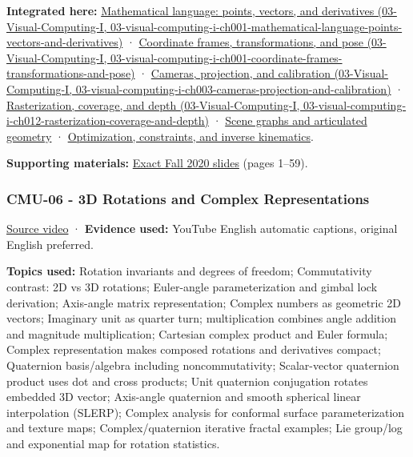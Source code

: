 \textbf{Integrated here:} \href{../03-Visual-Computing-I/main.pdf\#nameddest=03-visual-computing-i-ch001-mathematical-language-points-vectors-and-derivatives}{Mathematical language: points, vectors, and derivatives (03-Visual-Computing-I, 03-visual-computing-i-ch001-mathematical-language-points-vectors-and-derivatives)} · \href{../03-Visual-Computing-I/main.pdf\#nameddest=03-visual-computing-i-ch001-coordinate-frames-transformations-and-pose}{Coordinate frames, transformations, and pose (03-Visual-Computing-I, 03-visual-computing-i-ch001-coordinate-frames-transformations-and-pose)} · \href{../03-Visual-Computing-I/main.pdf\#nameddest=03-visual-computing-i-ch003-cameras-projection-and-calibration}{Cameras, projection, and calibration (03-Visual-Computing-I, 03-visual-computing-i-ch003-cameras-projection-and-calibration)} · \href{../03-Visual-Computing-I/main.pdf\#nameddest=03-visual-computing-i-ch012-rasterization-coverage-and-depth}{Rasterization, coverage, and depth (03-Visual-Computing-I, 03-visual-computing-i-ch012-rasterization-coverage-and-depth)} · \hyperref[04-visual-computing-ii-ch029-scene-graphs-and-articulated-geometry]{Scene graphs and articulated geometry} · \hyperref[04-visual-computing-ii-ch029-optimization-constraints-and-inverse-kinematics]{Optimization, constraints, and inverse kinematics}.

\textbf{Supporting materials:} \href{https://15462.courses.cs.cmu.edu/fall2020content/lectures/05_transformations/05_transformations_slides.pdf}{Exact Fall 2020 slides} (pages 1--59).

\subsubsection{CMU-06 - 3D Rotations and Complex Representations}\label{04-visual-computing-ii-ch036-cmu-06---3d-rotations-and-complex-representations}

\href{https://www.youtube.com/watch?v=YF5ZUlKxSgE}{Source video} · \textbf{Evidence used:} YouTube English automatic captions, original English preferred.

\textbf{Topics used:} Rotation invariants and degrees of freedom; Commutativity contrast: 2D vs 3D rotations; Euler-angle parameterization and gimbal lock derivation; Axis-angle matrix representation; Complex numbers as geometric 2D vectors; Imaginary unit as quarter turn; multiplication combines angle addition and magnitude multiplication; Cartesian complex product and Euler formula; Complex representation makes composed rotations and derivatives compact; Quaternion basis/algebra including noncommutativity; Scalar-vector quaternion product uses dot and cross products; Unit quaternion conjugation rotates embedded 3D vector; Axis-angle quaternion and smooth spherical linear interpolation (SLERP); Complex analysis for conformal surface parameterization and texture maps; Complex/quaternion iterative fractal examples; Lie group/log and exponential map for rotation statistics.

